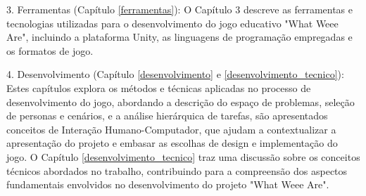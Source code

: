 3. Ferramentas (Capítulo \ref{ferramentas}): O Capítulo 3 descreve as ferramentas e tecnologias utilizadas para o desenvolvimento do jogo educativo "What Weee Are", incluindo a plataforma Unity, as linguagens de programação empregadas e os formatos de jogo.

4. Desenvolvimento (Capítulo \ref{desenvolvimento} e \ref{desenvolvimento_tecnico}): Estes capítulos explora os métodos e técnicas aplicadas no processo de desenvolvimento do jogo, abordando a descrição do espaço de problemas, seleção de personas e cenários, e a análise hierárquica de tarefas, são apresentados conceitos de Interação Humano-Computador, que ajudam a contextualizar a apresentação do projeto e embasar as escolhas de design e implementação do jogo.  O Capítulo \ref{desenvolvimento_tecnico} traz uma discussão sobre os conceitos técnicos abordados no trabalho, contribuindo para a compreensão dos aspectos fundamentais envolvidos no desenvolvimento do projeto "What Weee Are".
